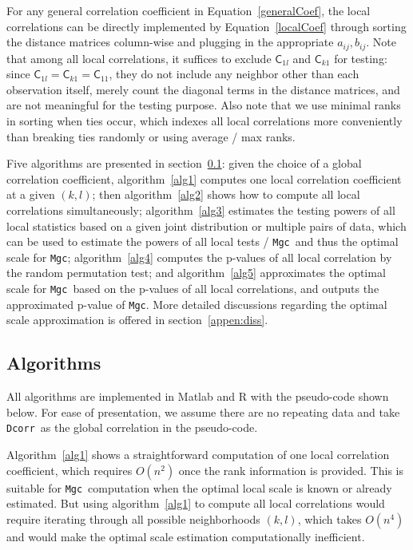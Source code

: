 \documentclass[11pt]{article}
\providecommand{\sct}[1]{{\sc \texttt{#1}}}
\newcommand{\G}{\mathsf{C}}
\newcommand{\Mgc}{\sct{Mgc}}
\newcommand{\Dcorr}{\sct{Dcorr}}
\begin{document}
For any general correlation coefficient in Equation~\ref{generalCoef}, the local correlations can be directly implemented by Equation~\ref{localCoef} through sorting the distance matrices column-wise and plugging in the appropriate $a_{ij}, b_{ij}$. Note that among all local correlations, it suffices to exclude $\G_{1l}$ and $\G_{k1}$ for testing: since $\G_{1l}=\G_{k1}=\G_{11}$, they do not include any neighbor other than each observation itself, merely count the diagonal terms in the distance matrices, and are not meaningful for the testing purpose. Also note that we use minimal ranks in sorting when ties occur, which indexes all local correlations more conveniently than breaking ties randomly or using average / max ranks.

Five algorithms are presented in section~\ref{appen:algorithms}: given the choice of a global correlation coefficient, algorithm~\ref{alg1} computes one local correlation coefficient at a given $(k,l)$; then algorithm~\ref{alg2} shows how to compute all local correlations simultaneously; algorithm~\ref{alg3} estimates the testing powers of all local statistics based on a given joint distribution or multiple pairs of data, which can be used to estimate the powers of all local tests / \Mgc~and thus the optimal scale for \Mgc; algorithm~\ref{alg4} computes the p-values of all local correlation by the random permutation test; and algorithm~\ref{alg5} approximates the optimal scale for \Mgc~based on the p-values of all local correlations, and outputs the approximated p-value of \Mgc. More detailed discussions regarding the optimal scale approximation is offered in section~\ref{appen:diss}.

\subsection{Algorithms}
\label{appen:algorithms}
All algorithms are implemented in Matlab and R with the pseudo-code shown below. For ease of presentation, we assume there are no repeating data and take \Dcorr~as the global correlation in the pseudo-code.

Algorithm~\ref{alg1} shows a straightforward computation of one local correlation coefficient, which requires $O(n^2)$ once the rank information is provided. This is suitable for \Mgc~computation when the optimal local scale is known or already estimated. But using algorithm~\ref{alg1} to compute all local correlations would require iterating through all possible neighborhoods $(k,l)$, which takes $O(n^4)$ and would make the optimal scale estimation computationally inefficient. 
\end{document}
